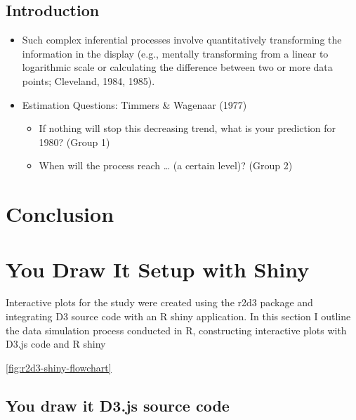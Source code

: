 \documentclass[print]{nuthesis}
\providecommand{\tightlist}{%
  \setlength{\itemsep}{0pt}\setlength{\parskip}{0pt}}
\begin{document}
\hypertarget{introduction-2}{%
\section{Introduction}\label{introduction-2}}

\begin{itemize}
\tightlist
\item
  Such complex inferential processes involve quantitatively transforming the information in the display (e.g., mentally transforming from a linear to logarithmic scale or calculating the difference between two or more data points; Cleveland, 1984, 1985).
\item
  Estimation Questions: Timmers \& Wagenaar (1977)

  \begin{itemize}
  \tightlist
  \item
    If nothing will stop this decreasing trend, what is your prediction for 1980? (Group 1)
  \item
    When will the process reach \ldots{} (a certain level)? (Group 2)
  \end{itemize}
\end{itemize}

\hypertarget{conclusion}{%
\chapter{Conclusion}\label{conclusion}}

\appendix

\hypertarget{youdrawit-with-shiny}{%
\chapter{You Draw It Setup with Shiny}\label{youdrawit-with-shiny}}

Interactive plots for the study were created using the r2d3 package and integrating D3 source code with an R shiny application.
In this section I outline the data simulation process conducted in R, constructing interactive plots with D3.js code and R shiny

\cref{fig:r2d3-shiny-flowchart}

\hypertarget{d3.js-source-code}{%
\section{You draw it D3.js source code}\label{d3.js-source-code}}
\end{document}
